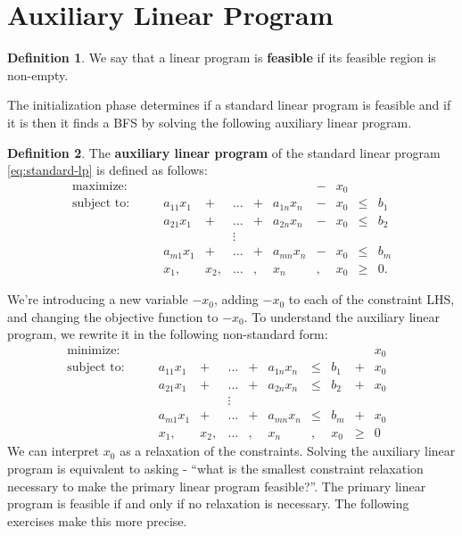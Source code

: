 \documentclass[
]{book}
\theoremstyle{definition}
\newtheorem{definition}{Definition}[chapter]
\theoremstyle{definition}
\theoremstyle{definition}
\theoremstyle{definition}
\theoremstyle{remark}
\begin{document}
\hypertarget{auxiliary-linear-program}{%
\section{Auxiliary Linear Program}\label{auxiliary-linear-program}}

\begin{definition}
We say that a linear program is \textbf{feasible} if its feasible region is non-empty.
\end{definition}

The initialization phase determines if a standard linear program is feasible and if it is then it finds a BFS by solving the following auxiliary linear program.

\begin{definition}
The \textbf{auxiliary linear program} of the standard linear program \eqref{eq:standard-lp} is defined as follows:
\begin{equation}
  \begin{array}{lrrrrrrrrrrr}
    \mbox{maximize: } &  &  &   &  & &  & & - & x_0 & \\
    \mbox{subject to: } 
      & & & a_{11} x_1 & + & \dots & + & a_{1n} x_n & - &x_0 & \leq & b_1 \\
      & & & a_{21} x_1 & + & \dots & + & a_{2n} x_n & - &x_0 & \leq & b_2 \\
      & & & & & \vdots &  \\
      & & & a_{m1} x_1 & + & \dots & + & a_{mn} x_n & - &x_0 & \leq & b_m \\
      & & & x_1, & x_2, & \dots &, & x_n & , & x_0 & \geq & 0.
  \end{array} 
  \label{eq:auxiliary-lp}
\end{equation}
\end{definition}

We're introducing a new variable \(-x_0\), adding \(-x_0\) to each of the constraint LHS, and changing the objective function to \(-x_0\).
To understand the auxiliary linear program, we rewrite it in the following non-standard form:
\begin{equation*}
  \begin{array}{lrrrrrrrrrrrrr}
    \mbox{minimize: } & & & & & & & & & & & x_0 & \\
    \mbox{subject to: } 
      & & & a_{11} x_1 & + & \dots & + & a_{1n} x_n & \leq & b_1 & + & x_0 \\
      & & & a_{21} x_1 & + & \dots & + & a_{2n} x_n & \leq & b_2 & + & x_0 \\
      & & & & & \vdots &  \\
      & & & a_{m1} x_1 & + & \dots & + & a_{mn} x_n & \leq & b_m & + & x_0 \\
      & & & x_1, & x_2, & \dots &, & x_n & , & x_0 & \geq & 0
  \end{array} 
\end{equation*}
We can interpret \(x_0\) as a relaxation of the constraints. Solving the auxiliary linear program is equivalent to asking - ``what is the smallest constraint relaxation necessary to make the primary linear program feasible?''. The primary linear program is feasible if and only if no relaxation is necessary. The following exercises make this more precise.
\end{document}
